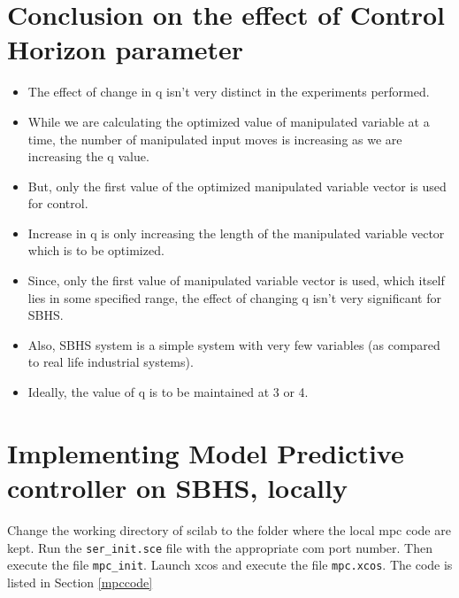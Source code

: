 \section{Conclusion on the effect of Control Horizon parameter }
\begin{itemize}
\item The effect of change in q isn’t very distinct in the experiments performed.
\item While we are calculating the optimized value of manipulated variable at a time, the number of manipulated input moves is increasing as we are increasing the q value. 
\item But, only the first value of the optimized manipulated variable vector is used for control. 
\item Increase in q is only increasing the length of the manipulated variable vector which is to be optimized.
\item Since, only the first value of manipulated variable vector is used, which itself lies in some specified range, the effect of changing q isn’t very significant for SBHS.
\item Also, SBHS system is a simple system with very few variables (as compared to real life industrial systems).
\item Ideally, the value of q is to be maintained at 3 or 4.
\end{itemize}

\section{Implementing Model Predictive controller on SBHS, locally}

Change the working directory of scilab to the folder where the local mpc code are kept. Run the {\tt ser\_init.sce} file with the appropriate com port number. Then execute the file {\tt mpc\_init}. Launch xcos and execute the file {\tt mpc.xcos}. The code is listed in Section \ref{mpccode}

